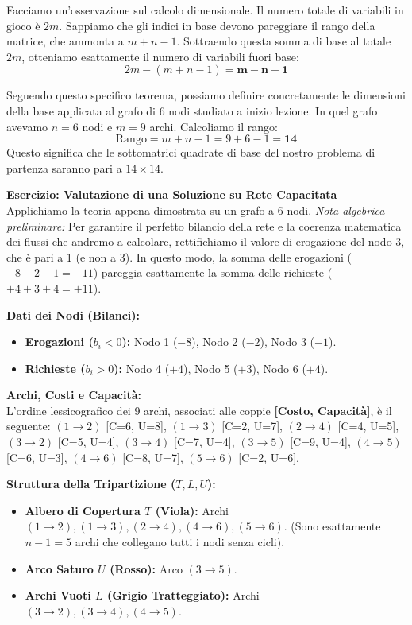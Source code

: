 \documentclass[12pt, a4paper]{article}
\begin{document}
	Facciamo un'osservazione sul calcolo dimensionale. Il numero totale di variabili in gioco è $2m$. Sappiamo che gli indici in base devono pareggiare il rango della matrice, che ammonta a $m + n - 1$. Sottraendo questa somma di base al totale $2m$, otteniamo esattamente il numero di variabili fuori base:
	\[ 2m - (m + n - 1) = \mathbf{m - n + 1} \]
	
	Seguendo questo specifico teorema, possiamo definire concretamente le dimensioni della base applicata al grafo di 6 nodi studiato a inizio lezione. In quel grafo avevamo $n = 6$ nodi e $m = 9$ archi. Calcoliamo il rango:
	\[ \text{Rango} = m + n - 1 = 9 + 6 - 1 = \mathbf{14} \]
	Questo significa che le sottomatrici quadrate di base del nostro problema di partenza saranno pari a \textbf{$14 \times 14$}.
	
	\textbf{Esercizio: Valutazione di una Soluzione su Rete Capacitata}\\
	Applichiamo la teoria appena dimostrata su un grafo a 6 nodi. 
	\textit{Nota algebrica preliminare:} Per garantire il perfetto bilancio della rete e la coerenza matematica dei flussi che andremo a calcolare, rettifichiamo il valore di erogazione del nodo 3, che è pari a 1 (e non a 3). 
	In questo modo, la somma delle erogazioni ($-8 -2 -1 = -11$) pareggia esattamente la somma delle richieste ($+4 +3 +4 = +11$).
	
	\textbf{Dati dei Nodi (Bilanci):}
	\begin{itemize}[label=\textcolor{titlecolor}{\Large\textbullet}, itemsep=2pt, leftmargin=1.5cm]
		\item \textbf{Erogazioni ($b_i < 0$):} Nodo 1 ($-8$), Nodo 2 ($-2$), Nodo 3 ($-1$).
		\item \textbf{Richieste ($b_i > 0$):} Nodo 4 ($+4$), Nodo 5 ($+3$), Nodo 6 ($+4$).
	\end{itemize}
	
	\textbf{Archi, Costi e Capacità:}\\
	L'ordine lessicografico dei 9 archi, associati alle coppie \textbf{[Costo, Capacità]}, è il seguente:
	$(1\to2)$ [C=6, U=8], $(1\to3)$ [C=2, U=7], $(2\to4)$ [C=4, U=5], $(3\to2)$ [C=5, U=4], $(3\to4)$ [C=7, U=4], $(3\to5)$ [C=9, U=4], $(4\to5)$ [C=6, U=3], $(4\to6)$ [C=8, U=7], $(5\to6)$ [C=2, U=6].
	
	\textbf{Struttura della Tripartizione ($T, L, U$):}
	\begin{itemize}[label=$\circ$, itemsep=2pt, leftmargin=1.5cm]
		\item \textbf{Albero di Copertura $T$ (Viola):} Archi $(1\to2), (1\to3), (2\to4), (4\to6), (5\to6)$. (Sono esattamente $n-1 = 5$ archi che collegano tutti i nodi senza cicli).
		\item \textbf{Arco Saturo $U$ (Rosso):} Arco $(3\to5)$.
		\item \textbf{Archi Vuoti $L$ (Grigio Tratteggiato):} Archi $(3\to2), (3\to4), (4\to5)$.
	\end{itemize}
	
\end{document}
